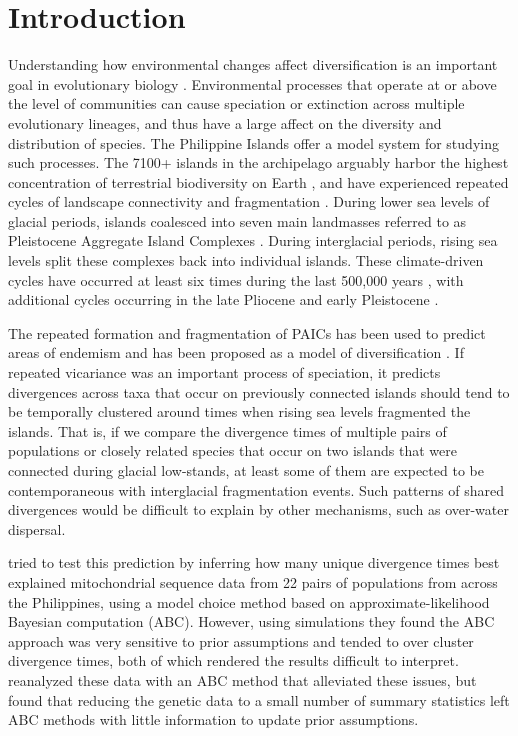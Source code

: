 \section{Introduction}

Understanding how environmental changes affect diversification is an important
goal in evolutionary biology \citationNeeded.
Environmental processes that operate at or above the level of communities can
cause speciation or extinction across multiple evolutionary lineages, and thus
have a large affect on the diversity and distribution of species.
The Philippine Islands offer a model system for studying such processes.
The 7100+ islands in the archipelago arguably harbor the highest concentration
of terrestrial biodiversity on Earth \citep{RafeDiesmos2009, Heaney1998}, and
have experienced repeated cycles of landscape connectivity and fragmentation
\citep{Voris2000}.
During lower sea levels of glacial periods, islands coalesced into seven main
landmasses referred to as Pleistocene Aggregate Island Complexes
\citep[PAICs;][]{RafeDiesmos2001}.
During interglacial periods, rising sea levels split these complexes back into
individual islands.
These climate-driven cycles have occurred at least six times during the last
500,000 years \citep{Rohling1998, Siddall2003}, with additional cycles
occurring in the late Pliocene and early Pleistocene
\citep{Haq1987, Miller2005}.

The repeated formation and fragmentation of PAICs has been used to predict
areas of endemism
and has been proposed as a model of diversification
\citep{Rafe2013AREES,RafeDiesmos2009, Heaney1986, Esselstyn2009MPE, Linkem2010,
    Siler2010, Siler2012, Roberts2006, Roberts2006MolEcol,Heaney1986,
    RafeDiesmos2001, RafeDiesmos2009}.
If repeated vicariance was an important process of speciation,
it predicts divergences across taxa that occur on previously connected islands
should tend to be temporally clustered around times when rising sea levels
fragmented the islands.
That is, if we compare the divergence times of multiple pairs of populations or
closely related species that occur on two islands that were connected during
glacial low-stands, at least some of them are expected to be contemporaneous
with interglacial fragmentation events.
Such patterns of shared divergences would be difficult to explain by other
mechanisms, such as over-water dispersal.

\citet{Oaks2012} tried to test this prediction by inferring how many unique
divergence times best explained mitochondrial sequence data from 22 pairs of
populations from across the Philippines, using a model choice method based on
approximate-likelihood Bayesian computation (ABC).
However, using simulations they found the ABC approach was very sensitive to
prior assumptions and tended to over cluster divergence times, both of which
rendered the results difficult to interpret.
\citet{Oaks2014dpp} reanalyzed these data with an ABC method that alleviated
these issues, but found that reducing the genetic data to a small number of
summary statistics left ABC methods with little information to update prior
assumptions.

